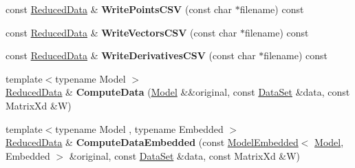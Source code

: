 \begin{DoxyCompactItemize}
\item 
\hypertarget{struct_d_r_d_s_p_1_1_reduced_data_aa376ae9d885b517f7e7c11f4620f377b}{const \hyperlink{struct_d_r_d_s_p_1_1_reduced_data}{Reduced\-Data} \& {\bfseries Write\-Points\-C\-S\-V} (const char $\ast$filename) const }\label{struct_d_r_d_s_p_1_1_reduced_data_aa376ae9d885b517f7e7c11f4620f377b}

\item 
\hypertarget{struct_d_r_d_s_p_1_1_reduced_data_aa23b6a66a599024c891967cc7a753b74}{const \hyperlink{struct_d_r_d_s_p_1_1_reduced_data}{Reduced\-Data} \& {\bfseries Write\-Vectors\-C\-S\-V} (const char $\ast$filename) const }\label{struct_d_r_d_s_p_1_1_reduced_data_aa23b6a66a599024c891967cc7a753b74}

\item 
\hypertarget{struct_d_r_d_s_p_1_1_reduced_data_a026a6a8c0f50dbe684dd274acd40286c}{const \hyperlink{struct_d_r_d_s_p_1_1_reduced_data}{Reduced\-Data} \& {\bfseries Write\-Derivatives\-C\-S\-V} (const char $\ast$filename) const }\label{struct_d_r_d_s_p_1_1_reduced_data_a026a6a8c0f50dbe684dd274acd40286c}

\item 
\hypertarget{struct_d_r_d_s_p_1_1_reduced_data_a1444567077495f5d80ed3c440134dfe7}{{\footnotesize template$<$typename Model $>$ }\\\hyperlink{struct_d_r_d_s_p_1_1_reduced_data}{Reduced\-Data} \& {\bfseries Compute\-Data} (\hyperlink{struct_d_r_d_s_p_1_1_model}{Model} \&\&original, const \hyperlink{struct_d_r_d_s_p_1_1_data_set}{Data\-Set} \&data, const Matrix\-Xd \&W)}\label{struct_d_r_d_s_p_1_1_reduced_data_a1444567077495f5d80ed3c440134dfe7}

\item 
\hypertarget{struct_d_r_d_s_p_1_1_reduced_data_a1bd28c977de1294d9303687080eb4df8}{{\footnotesize template$<$typename Model , typename Embedded $>$ }\\\hyperlink{struct_d_r_d_s_p_1_1_reduced_data}{Reduced\-Data} \& {\bfseries Compute\-Data\-Embedded} (const \hyperlink{struct_d_r_d_s_p_1_1_model_embedded}{Model\-Embedded}$<$ \hyperlink{struct_d_r_d_s_p_1_1_model}{Model}, Embedded $>$ \&original, const \hyperlink{struct_d_r_d_s_p_1_1_data_set}{Data\-Set} \&data, const Matrix\-Xd \&W)}\label{struct_d_r_d_s_p_1_1_reduced_data_a1bd28c977de1294d9303687080eb4df8}

\end{DoxyCompactItemize}
